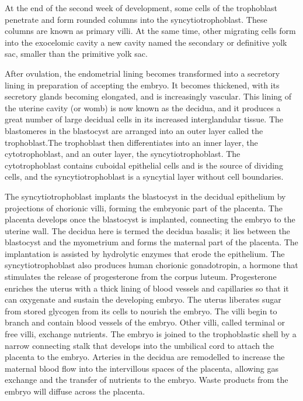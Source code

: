 At the end of the second week of development, some cells of the trophoblast penetrate and form rounded columns into the syncytiotrophoblast. These columns are known as primary villi. At the same time, other migrating cells form into the exocelomic cavity a new cavity named the secondary or definitive yolk sac, smaller than the primitive yolk sac.

After ovulation, the endometrial lining becomes transformed into a secretory lining in preparation of accepting the embryo. It becomes thickened, with its secretory glands becoming elongated, and is increasingly vascular. This lining of the uterine cavity (or womb) is now known as the decidua, and it produces a great number of large decidual cells in its increased interglandular tissue. The blastomeres in the blastocyst are arranged into an outer layer called the trophoblast.The trophoblast then differentiates into an inner layer, the cytotrophoblast, and an outer layer, the syncytiotrophoblast. The cytotrophoblast contains cuboidal epithelial cells and is the source of dividing cells, and the syncytiotrophoblast is a syncytial layer without cell boundaries.

The syncytiotrophoblast implants the blastocyst in the decidual epithelium by projections of chorionic villi, forming the embryonic part of the placenta. The placenta develops once the blastocyst is implanted, connecting the embryo to the uterine wall. The decidua here is termed the decidua basalis; it lies between the blastocyst and the myometrium and forms the maternal part of the placenta. The implantation is assisted by hydrolytic enzymes that erode the epithelium. The syncytiotrophoblast also produces human chorionic gonadotropin, a hormone that stimulates the release of progesterone from the corpus luteum. Progesterone enriches the uterus with a thick lining of blood vessels and capillaries so that it can oxygenate and sustain the developing embryo. The uterus liberates sugar from stored glycogen from its cells to nourish the embryo. The villi begin to branch and contain blood vessels of the embryo. Other villi, called terminal or free villi, exchange nutrients. The embryo is joined to the trophoblastic shell by a narrow connecting stalk that develops into the umbilical cord to attach the placenta to the embryo. Arteries in the decidua are remodelled to increase the maternal blood flow into the intervillous spaces of the placenta, allowing gas exchange and the transfer of nutrients to the embryo. Waste products from the embryo will diffuse across the placenta.

